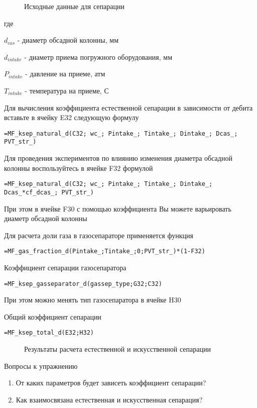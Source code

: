 \begin{figure}[h!]
	\center{\texttt{[image: Ex60\_1]}}
	\caption{Исходные данные для сепарации}
	\label{ris:Ex60_1}
\end{figure}

где

$d_{cas}$ - диаметр обсадной колонны, мм

$d_{intake}$ - диаметр приема погружного оборудования, мм

$P_{intake}$ - давление на приеме, атм

$T_{intake}$ - температура на приеме, С

Для вычисления коэффициента естественной сепарации в зависимости от дебита вставьте в ячейку E32 следующую формулу 

{ \small  \texttt{=MF\_ksep\_natural\_d(C32; wc\_; Pintake\_; Tintake\_; Dintake\_; Dcas\_; PVT\_str\_)}}

Для проведения экспериментов по влиянию изменения диаметра обсадной колонны воспользуйтесь в ячейке F32 формулой

{ \small  \texttt{=MF\_ksep\_natural\_d(C32; wc\_; Pintake\_; Tintake\_; Dintake\_; Dcas\_*cf\_dcas\_; PVT\_str\_)}}

При этом в ячейке F30 с помощью коэффициента Вы можете варьировать диаметр обсадной колонны

Для расчета доли газа в газосепараторе применяется функция

{ \small  \texttt{=MF\_gas\_fraction\_d(Pintake\_;Tintake\_;0;PVT\_str\_)*(1-F32)
}}

Коэффициент сепарации газосепаратора

{ \small  \texttt{=MF\_ksep\_gasseparator\_d(gassep\_type;G32;C32)
}}

При этом можно менять тип газосепаратора в ячейке H30

Общий коэффициент сепарации

{ \small  \texttt{=MF\_ksep\_total\_d(E32;H32)
}}

\begin{figure}[h!]
	\center{\texttt{[image: Ex60\_2]}}
	\caption{Результаты расчета естественной и искусственной сепарации}
	\label{ris:Ex60_2}
\end{figure}

Вопросы к упражнению

\begin{enumerate}
	\item От каких параметров будет зависеть коэффициент сепарации?
	\item Как взаимосвязана естественная и искусственная сепарация? 
\end{enumerate}


